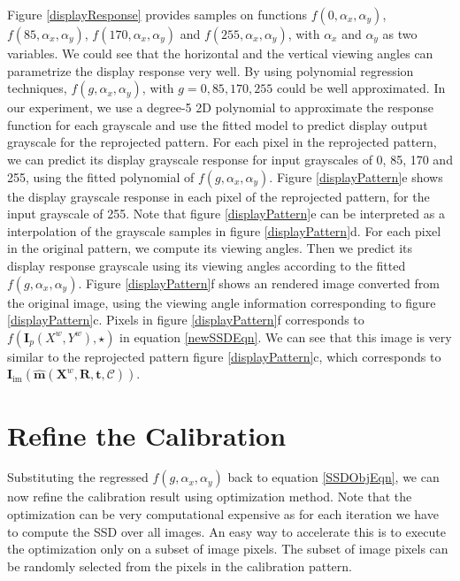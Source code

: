 \documentclass{report}
\begin{document}
Figure \ref{displayResponse} provides samples on functions $f(0, \alpha_x, \alpha_y)$, $f(85, \alpha_x, \alpha_y)$, $f(170, \alpha_x, \alpha_y)$ and $f(255, \alpha_x, \alpha_y)$, with $\alpha_x$ and $\alpha_y$ as two variables. We could see that the horizontal and the vertical viewing angles can parametrize the display response very well. By using polynomial regression techniques, $f(g, \alpha_x, \alpha_y)$, with $g = 0, 85, 170, 255$ could be well approximated. In our experiment, we use a degree-5 2D polynomial to approximate the response function for each grayscale and use the fitted model to predict display output grayscale for the reprojected pattern. For each pixel in the reprojected pattern, we can predict its display grayscale response for input grayscales  of 0, 85, 170 and 255, using the fitted polynomial of $f(g, \alpha_x, \alpha_y)$. Figure \ref{displayPattern}e shows the display grayscale response in each pixel of the reprojected pattern, for the input grayscale of 255. Note that figure \ref{displayPattern}e can be interpreted as a interpolation of the grayscale samples in figure \ref{displayPattern}d. For each pixel in the original pattern, we compute its viewing angles. Then we predict its display response grayscale using its viewing angles according to the fitted $f(g, \alpha_x, \alpha_y)$. Figure \ref{displayPattern}f shows an rendered image converted from the original image, using the viewing angle information corresponding to figure \ref{displayPattern}c. Pixels in figure \ref{displayPattern}f corresponds to $f\left( \mathbf{I}_p(X^w, Y^w), \star \right)$ in equation \ref{newSSDEqn}. We can see that this image is very similar to the reprojected pattern figure \ref{displayPattern}c, which corresponds to $\mathbf{I}_\text{im}\left(\hat{\mathbf{m}}(\mathbf{X}^w, \mathbf{R}, \mathbf{t}, \mathcal{C})\right)$. 


\section{Refine the Calibration}
Substituting the regressed $f(g, \alpha_x, \alpha_y)$ back to equation \ref{SSDObjEqn}, we can now refine the calibration result using optimization method. Note that the optimization can be very computational expensive as for each iteration we have to compute the SSD over all images. An easy way to accelerate this is to execute the optimization only on a subset of image pixels. The subset of image pixels can be randomly selected from the pixels in the calibration pattern.
 
\end{document}
